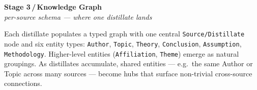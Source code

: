 \documentclass[11pt]{article}
\newcommand{\stage}[3]{%
    {\Large\color{accent}\textbf{Stage #1\,/\,#2}}\\[2pt]
    {\color{soft}\itshape #3}\par\vspace{8pt}%
}
\begin{document}
\begin{center}
{
}
\end{center}

\newpage

\stage{3}{Knowledge Graph}{per-source schema — where one distillate lands}

Each distillate populates a typed graph with one central
\texttt{Source/Distillate} node and six entity types: \texttt{Author},
\texttt{Topic}, \texttt{Theory}, \texttt{Conclusion}, \texttt{Assumption},
\texttt{Methodology}. Higher-level entities (\texttt{Affiliation},
\texttt{Theme}) emerge as natural groupings. As distillates accumulate, shared
entities — e.g.\ the same Author or Topic across many sources — become hubs
that surface non-trivial cross-source connections.
\end{document}
